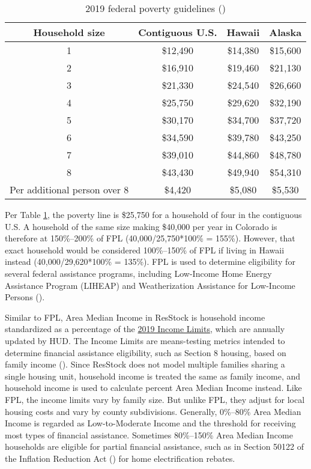 \begin{table}
    \caption{2019 federal poverty guidelines (\cite{aspe_2019_fpl})}
    \label{tab:fpl}
    \centering
    \begin{tabular}{|c|c|c|c|}
    \hline
        Household size & Contiguous U.S. & Hawaii & Alaska \\
        \hline
        1 & \$12,490 & \$14,380 & \$15,600 \\
        2 & \$16,910 & \$19,460 & \$21,130 \\
        3 & \$21,330 & \$24,540 & \$26,660 \\
        4 & \$25,750 & \$29,620 & \$32,190 \\
        5 & \$30,170 & \$34,700 & \$37,720 \\
        6 & \$34,590 & \$39,780 & \$43,250 \\
        7 & \$39,010 & \$44,860 & \$48,780 \\
        8 & \$43,430 & \$49,940 & \$54,310 \\
        \hline
        Per additional person over 8 & \$4,420 & \$5,080 & \$5,530 \\
        \hline
    \end{tabular}
\end{table}

Per Table \ref{tab:fpl}, the poverty line is \$25,750 for a household of four in the contiguous U.S. A household of the same size making \$40,000 per year in Colorado is therefore at 150\%--200\% of FPL (40,000/25,750*100\% = 155\%). However, that exact household would be considered 100\%--150\% of FPL if living in Hawaii instead (40,000/29,620*100\% = 135\%). FPL is used to determine eligibility for several federal assistance programs, including Low-Income Home Energy Assistance Program (LIHEAP) and Weatherization Assistance for Low-Income Persons (\cite{aspe_fpl_use}).

Similar to FPL, Area Median Income in ResStock is household income standardized as a percentage of the \href{https://www.huduser.gov/portal/datasets/il.html#data_2019}{2019 Income Limits}, which are annually updated by HUD. The Income Limits are means-testing metrics intended to determine financial assistance eligibility, such as Section 8 housing, based on family income (\cite{hud2019_inc_lim_method}). Since ResStock does not model multiple families sharing a single housing unit, household income is treated the same as family income, and household income is used to calculate percent Area Median Income instead. Like FPL, the income limits vary by family size. But unlike FPL, they adjust for local housing costs and vary by county subdivisions. Generally, 0\%--80\% Area Median Income is regarded as Low-to-Moderate Income and the threshold for receiving most types of financial assistance. Sometimes 80\%--150\% Area Median Income households are eligible for partial financial assistance, such as in Section 50122 of the Inflation Reduction Act (\cite{2022IRA}) for home electrification rebates.

